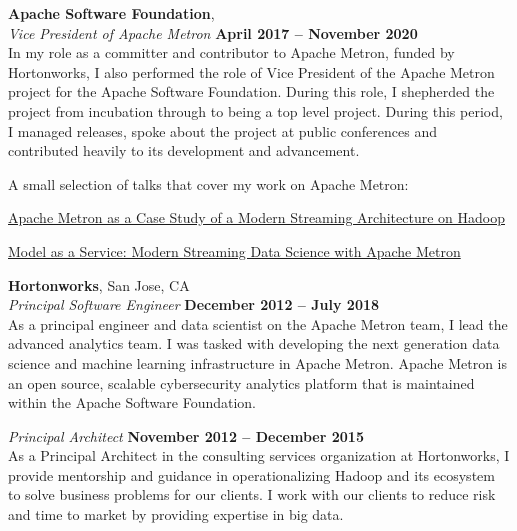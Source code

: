 \documentclass[margin,line,12pt]{resume}
\begin{document}
\begin{resume}
    \textbf{Apache Software Foundation}, \vspace{2mm}\\\vspace{1mm}%
    \textsl{Vice President of Apache Metron} \hfill \textbf{April 2017 -- November 2020}\\
    In my role as a committer and contributor to Apache Metron, funded by Hortonworks, I also
    performed the role of Vice President of the Apache Metron project for the Apache Software
    Foundation.  During this role, I shepherded the project from incubation through to being
    a top level project.  During this period, I managed releases, spoke about the project at
    public conferences and contributed heavily to its development and advancement.

    A small selection of talks that cover my work on Apache Metron:
    \begin{list2}
    \item \href{https://www.slideshare.net/Hadoop_Summit/bringing-it-all-together-apache-metron-incubating-as-a-case-study-of-a-modern-streaming-architecture-on-hadoop}{Apache Metron as a Case Study of a Modern Streaming Architecture on Hadoop}
    \item \href{https://www.slideshare.net/Hadoop_Summit/maas-model-as-a-service-modern-streaming-data-science-with-apache-metron-incubating}{Model as a Service: Modern Streaming Data Science with Apache Metron}
    \end{list2}

    \textbf{Hortonworks}, San Jose, CA \vspace{2mm}\\\vspace{1mm}%
    \textsl{Principal Software Engineer} \hfill \textbf{December 2012 -- July 2018}\\
    As a principal engineer and data scientist on the Apache Metron team, I lead the
    advanced analytics team. I was tasked with developing the next generation data science
    and machine learning infrastructure in Apache Metron.  Apache Metron is an open source,
    scalable cybersecurity analytics platform that is maintained within the
    Apache Software Foundation.

    \newpage
    \vspace*{1mm}

    \textsl{Principal Architect} \hfill \textbf{November 2012 -- December 2015}\\
    As a Principal Architect in the consulting services organization at Hortonworks, I provide
    mentorship and guidance in operationalizing Hadoop and its ecosystem to solve business problems
    for our clients.  I work with our clients to reduce risk and time to market by providing expertise
    in big data.


\end{resume}
\end{document}

